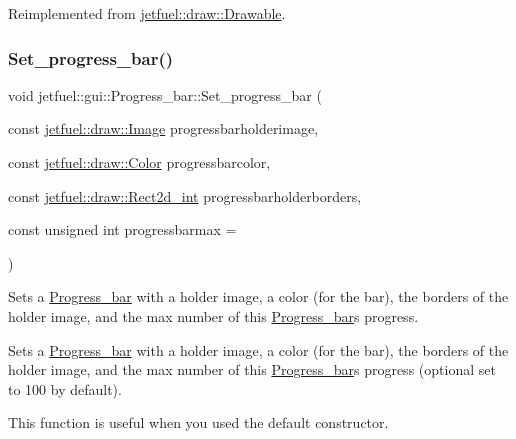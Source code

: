 Reimplemented from \hyperlink{classjetfuel_1_1draw_1_1Drawable_afdd035afe40c706459a6c9df813bcce6}{jetfuel\+::draw\+::\+Drawable}.

\mbox{\label{classjetfuel_1_1gui_1_1Progress__bar_aef1b768b22c17ce9dab2fd12a9370262}} 
\subsubsection{\texorpdfstring{Set\+\_\+progress\+\_\+bar()}{Set\_progress\_bar()}}
{\footnotesize\ttfamily void jetfuel\+::gui\+::\+Progress\+\_\+bar\+::\+Set\+\_\+progress\+\_\+bar (\begin{DoxyParamCaption}\item[{const \hyperlink{classjetfuel_1_1draw_1_1Image}{jetfuel\+::draw\+::\+Image}}]{progressbarholderimage,  }\item[{const \hyperlink{classjetfuel_1_1draw_1_1Color}{jetfuel\+::draw\+::\+Color}}]{progressbarcolor,  }\item[{const \hyperlink{classjetfuel_1_1draw_1_1Rect2d}{jetfuel\+::draw\+::\+Rect2d\+\_\+int}}]{progressbarholderborders,  }\item[{const unsigned int}]{progressbarmax = {} }\end{DoxyParamCaption})}



Sets a \hyperlink{classjetfuel_1_1gui_1_1Progress__bar}{Progress\+\_\+bar} with a holder image, a color (for the bar), the borders of the holder image, and the max number of this \hyperlink{classjetfuel_1_1gui_1_1Progress__bar}{Progress\+\_\+bar}\textquotesingle{}s progress. 

Sets a \hyperlink{classjetfuel_1_1gui_1_1Progress__bar}{Progress\+\_\+bar} with a holder image, a color (for the bar), the borders of the holder image, and the max number of this \hyperlink{classjetfuel_1_1gui_1_1Progress__bar}{Progress\+\_\+bar}\textquotesingle{}s progress (optional set to 100 by default).

This function is useful when you used the default constructor.


